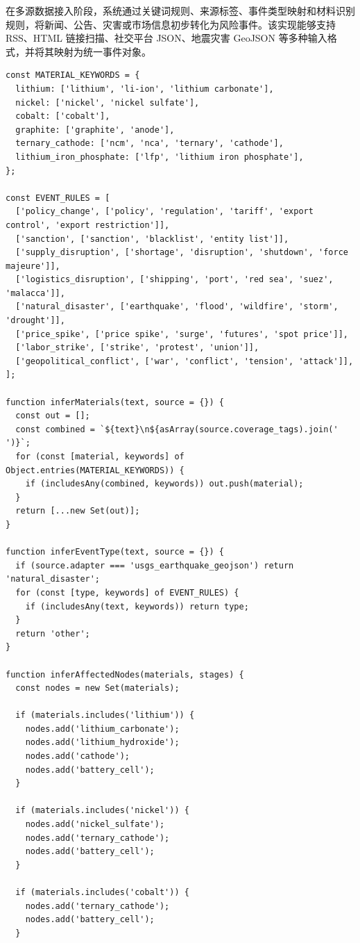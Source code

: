 ﻿\documentclass[12pt,a4paper]{article}
\begin{document}
在多源数据接入阶段，系统通过关键词规则、来源标签、事件类型映射和材料识别规则，将新闻、公告、灾害或市场信息初步转化为风险事件。该实现能够支持 RSS、HTML 链接扫描、社交平台 JSON、地震灾害 GeoJSON 等多种输入格式，并将其映射为统一事件对象。

\begin{lstlisting}[style=projectcode,caption={多源新闻条目到风险事件的抽取与映射}]
const MATERIAL_KEYWORDS = {
  lithium: ['lithium', 'li-ion', 'lithium carbonate'],
  nickel: ['nickel', 'nickel sulfate'],
  cobalt: ['cobalt'],
  graphite: ['graphite', 'anode'],
  ternary_cathode: ['ncm', 'nca', 'ternary', 'cathode'],
  lithium_iron_phosphate: ['lfp', 'lithium iron phosphate'],
};

const EVENT_RULES = [
  ['policy_change', ['policy', 'regulation', 'tariff', 'export control', 'export restriction']],
  ['sanction', ['sanction', 'blacklist', 'entity list']],
  ['supply_disruption', ['shortage', 'disruption', 'shutdown', 'force majeure']],
  ['logistics_disruption', ['shipping', 'port', 'red sea', 'suez', 'malacca']],
  ['natural_disaster', ['earthquake', 'flood', 'wildfire', 'storm', 'drought']],
  ['price_spike', ['price spike', 'surge', 'futures', 'spot price']],
  ['labor_strike', ['strike', 'protest', 'union']],
  ['geopolitical_conflict', ['war', 'conflict', 'tension', 'attack']],
];

function inferMaterials(text, source = {}) {
  const out = [];
  const combined = `${text}\n${asArray(source.coverage_tags).join(' ')}`;
  for (const [material, keywords] of Object.entries(MATERIAL_KEYWORDS)) {
    if (includesAny(combined, keywords)) out.push(material);
  }
  return [...new Set(out)];
}

function inferEventType(text, source = {}) {
  if (source.adapter === 'usgs_earthquake_geojson') return 'natural_disaster';
  for (const [type, keywords] of EVENT_RULES) {
    if (includesAny(text, keywords)) return type;
  }
  return 'other';
}

function inferAffectedNodes(materials, stages) {
  const nodes = new Set(materials);

  if (materials.includes('lithium')) {
    nodes.add('lithium_carbonate');
    nodes.add('lithium_hydroxide');
    nodes.add('cathode');
    nodes.add('battery_cell');
  }

  if (materials.includes('nickel')) {
    nodes.add('nickel_sulfate');
    nodes.add('ternary_cathode');
    nodes.add('battery_cell');
  }

  if (materials.includes('cobalt')) {
    nodes.add('ternary_cathode');
    nodes.add('battery_cell');
  }


\end{lstlisting}
\end{document}
